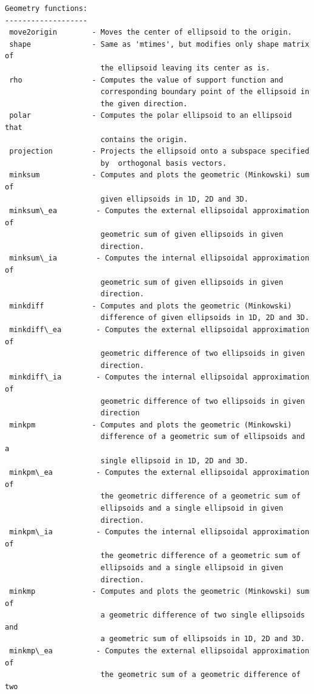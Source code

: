 \documentclass[letterpaper,10pt,english]{sphinxmanual}
\begin{document}
\begin{Verbatim}[commandchars=\\\{\}]
Geometry functions:
-------------------
 move2origin        - Moves the center of ellipsoid to the origin.
 shape              - Same as 'mtimes', but modifies only shape matrix of
                      the ellipsoid leaving its center as is.
 rho                - Computes the value of support function and
                      corresponding boundary point of the ellipsoid in
                      the given direction.
 polar              - Computes the polar ellipsoid to an ellipsoid that
                      contains the origin.
 projection         - Projects the ellipsoid onto a subspace specified
                      by  orthogonal basis vectors.
 minksum            - Computes and plots the geometric (Minkowski) sum of
                      given ellipsoids in 1D, 2D and 3D.
 minksum\_ea         - Computes the external ellipsoidal approximation of
                      geometric sum of given ellipsoids in given
                      direction.
 minksum\_ia         - Computes the internal ellipsoidal approximation of
                      geometric sum of given ellipsoids in given
                      direction.
 minkdiff           - Computes and plots the geometric (Minkowski)
                      difference of given ellipsoids in 1D, 2D and 3D.
 minkdiff\_ea        - Computes the external ellipsoidal approximation of
                      geometric difference of two ellipsoids in given
                      direction.
 minkdiff\_ia        - Computes the internal ellipsoidal approximation of
                      geometric difference of two ellipsoids in given
                      direction
 minkpm             - Computes and plots the geometric (Minkowski)
                      difference of a geometric sum of ellipsoids and a
                      single ellipsoid in 1D, 2D and 3D.
 minkpm\_ea          - Computes the external ellipsoidal approximation of
                      the geometric difference of a geometric sum of
                      ellipsoids and a single ellipsoid in given
                      direction.
 minkpm\_ia          - Computes the internal ellipsoidal approximation of
                      the geometric difference of a geometric sum of
                      ellipsoids and a single ellipsoid in given
                      direction.
 minkmp             - Computes and plots the geometric (Minkowski) sum of
                      a geometric difference of two single ellipsoids and
                      a geometric sum of ellipsoids in 1D, 2D and 3D.
 minkmp\_ea          - Computes the external ellipsoidal approximation of
                      the geometric sum of a geometric difference of two

\end{Verbatim}
\end{document}
